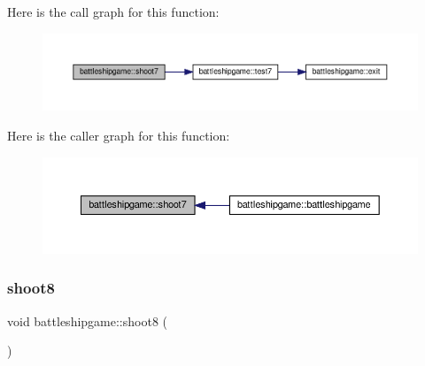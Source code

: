 Here is the call graph for this function\+:
\nopagebreak
\begin{figure}[H]
\begin{center}
\leavevmode
\includegraphics[width=350pt]{classbattleshipgame_a56ca4e048cb8e5d66719ceca1b556d76_cgraph}
\end{center}
\end{figure}
Here is the caller graph for this function\+:
\nopagebreak
\begin{figure}[H]
\begin{center}
\leavevmode
\includegraphics[width=350pt]{classbattleshipgame_a56ca4e048cb8e5d66719ceca1b556d76_icgraph}
\end{center}
\end{figure}
\mbox{\label{classbattleshipgame_a54920293bf8c78680cab53c79958e609}} 
\subsubsection{\texorpdfstring{shoot8}{shoot8}}
{\footnotesize\ttfamily void battleshipgame\+::shoot8 (\begin{DoxyParamCaption}{ }\end{DoxyParamCaption})\hspace{0.3cm}{\ttfamily [slot]}}

